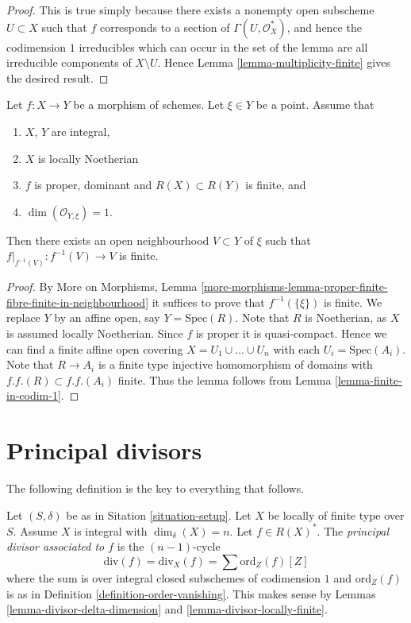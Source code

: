 \begin{proof}
This is true simply because there exists a nonempty open subscheme
$U \subset X$ such that $f$ corresponds to a section of
$\Gamma(U, \mathcal{O}_X^*)$, and hence the codimension $1$
irreducibles which can occur in the set of the lemma are all
irreducible components of $X \setminus U$.
Hence Lemma \ref{lemma-multiplicity-finite} gives the desired result.
\end{proof}

\begin{lemma}
\label{lemma-finite-in-codimension-one}
Let $f : X \to Y$ be a morphism of schemes.
Let $\xi \in Y$ be a point.
Assume that
\begin{enumerate}
\item $X$, $Y$ are integral,
\item $X$ is locally Noetherian
\item $f$ is proper, dominant and $R(X) \subset R(Y)$ is finite, and
\item $\dim(\mathcal{O}_{Y, \xi}) = 1$.
\end{enumerate}
Then there exists an open neighbourhood $V \subset Y$ of $\xi$
such that $f|_{f^{-1}(V)} : f^{-1}(V) \to V$ is finite.
\end{lemma}

\begin{proof}
By
More on Morphisms,
Lemma \ref{more-morphisms-lemma-proper-finite-fibre-finite-in-neighbourhood}
it suffices to prove that $f^{-1}(\{\xi\})$ is finite.
We replace $Y$ by an affine open, say $Y = \text{Spec}(R)$.
Note that $R$ is Noetherian, as $X$ is assumed locally Noetherian.
Since $f$ is proper it is quasi-compact. Hence we can find a finite
affine open covering $X = U_1 \cup \ldots \cup U_n$ with
each $U_i = \text{Spec}(A_i)$. Note that $R \to A_i$ is a
finite type injective homomorphism of domains with
$f.f.(R) \subset f.f.(A_i)$ finite. Thus the lemma follows
from Lemma \ref{lemma-finite-in-codim-1}.
\end{proof}


\section{Principal divisors}
\label{section-principal-divisors}

\noindent
The following definition is the key to everything that follows.

\begin{definition}
\label{definition-principal-divisor}
Let $(S, \delta)$ be as in Sitation \ref{situation-setup}.
Let $X$ be locally of finite type over $S$. Assume $X$ is
integral with $\dim_\delta(X) = n$.
Let $f \in R(X)^*$. The {\it principal divisor
associated to $f$} is the $(n - 1)$-cycle
$$
\text{div}(f) = \text{div}_X(f) = \sum \text{ord}_Z(f) [Z]
$$
where the sum is over integral closed subschemes of
codimension $1$ and $\text{ord}_Z(f)$ is as in
Definition \ref{definition-order-vanishing}. This makes sense
by Lemmas \ref{lemma-divisor-delta-dimension} and
\ref{lemma-divisor-locally-finite}.
\end{definition}


